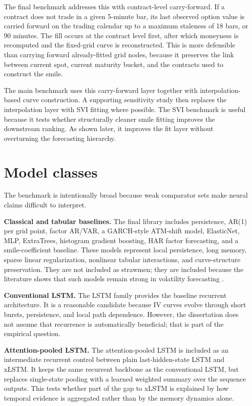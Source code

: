 \documentclass[12pt]{report}
\begin{document}
The final benchmark addresses this with contract-level carry-forward. If a contract does not trade in a given 5-minute bar, its last observed option value is carried forward on the trading calendar up to a maximum staleness of 18 bars, or 90 minutes. The fill occurs at the contract level first, after which moneyness is recomputed and the fixed-grid curve is reconstructed. This is more defensible than carrying forward already-fitted grid nodes, because it preserves the link between current spot, current maturity bucket, and the contracts used to construct the smile.

The main benchmark uses this carry-forward layer together with interpolation-based curve construction. A supporting sensitivity study then replaces the interpolation layer with SVI fitting where possible. The SVI benchmark is useful because it tests whether structurally cleaner smile fitting improves the downstream ranking. As shown later, it improves the fit layer without overturning the forecasting hierarchy.

\section{Model classes}
The benchmark is intentionally broad because weak comparator sets make neural claims difficult to interpret.

\textbf{Classical and tabular baselines.} The final library includes persistence, AR(1) per grid point, factor AR/VAR, a GARCH-style ATM-shift model, ElasticNet, MLP, ExtraTrees, histogram gradient boosting, HAR factor forecasting, and a smile-coefficient baseline. These models represent local persistence, long memory, sparse linear regularization, nonlinear tabular interactions, and curve-structure preservation. They are not included as strawmen; they are included because the literature shows that such models remain strong in volatility forecasting \citep{engle1982,bollerslev1986,corsi2009,chen2024bspline}.

\textbf{Conventional LSTM.} The LSTM family provides the baseline recurrent architecture. It is a reasonable candidate because IV curves evolve through short bursts, persistence, and local path dependence. However, the dissertation does not assume that recurrence is automatically beneficial; that is part of the empirical question.

\textbf{Attention-pooled LSTM.} The attention-pooled LSTM is included as an intermediate recurrent control between plain last-hidden-state LSTM and xLSTM. It keeps the same recurrent backbone as the conventional LSTM, but replaces single-state pooling with a learned weighted summary over the sequence outputs. This tests whether part of the gap to xLSTM is explained by how temporal evidence is aggregated rather than by the memory dynamics alone.
\end{document}
